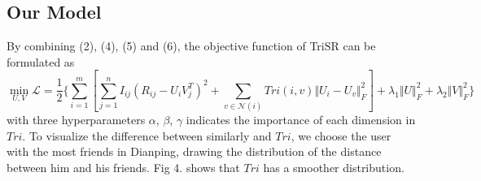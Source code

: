 \documentclass{article}
\begin{document}
\subsection{Our Model}
By combining (2), (4), (5) and (6), the objective function of TriSR can be formulated as
\begin{equation}
  \min_{U, V} \mathcal{L} = \frac{1}{2} \{\sum_{i=1}^m [\sum_{j=1}^n I_{ij} (R_{ij} - U_iV_j^T)^2 + \sum_{v \in \mathcal{N}(i)} Tri(i, v) \Vert U_i - U_v \Vert_F^2 ] + \lambda_1 \Vert U \Vert_F^2 + \lambda_2 \Vert V \Vert_F^2 \}
\end{equation}
with three hyperparameters $\alpha$, $\beta$, $\gamma$ indicates the importance of each dimension in $Tri$. 
To visualize the difference between similarly and $Tri$, we choose the user with the most friends in Dianping, drawing the distribution 
of the distance between him and his friends. Fig 4. shows that $Tri$ has a smoother distribution.
\end{document}
